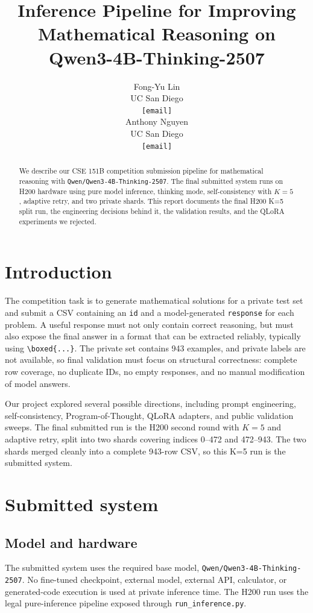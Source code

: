 \documentclass{article}
\title{Inference Pipeline for Improving Mathematical Reasoning on Qwen3-4B-Thinking-2507}
\author{%
  Fong-Yu Lin \\
  UC San Diego \\
  \texttt{[email]} \\
  \And
  Anthony Nguyen \\
  UC San Diego \\
  \texttt{[email]} \\
}
\begin{document}
\maketitle

\begin{abstract}
We describe our CSE 151B competition submission pipeline for mathematical reasoning with \texttt{Qwen/Qwen3-4B-Thinking-2507}. The final submitted system runs on H200 hardware using pure model inference, thinking mode, self-consistency with $K=5$, adaptive retry, and two private shards. This report documents the final H200 K=5 split run, the engineering decisions behind it, the validation results, and the QLoRA experiments we rejected.
\end{abstract}

\section{Introduction}

The competition task is to generate mathematical solutions for a private test set and submit a CSV containing an \texttt{id} and a model-generated \texttt{response} for each problem. A useful response must not only contain correct reasoning, but must also expose the final answer in a format that can be extracted reliably, typically using \verb|\boxed{...}|. The private set contains 943 examples, and private labels are not available, so final validation must focus on structural correctness: complete row coverage, no duplicate IDs, no empty responses, and no manual modification of model answers.

Our project explored several possible directions, including prompt engineering, self-consistency, Program-of-Thought, QLoRA adapters, and public validation sweeps. The final submitted run is the H200 second round with $K=5$ and adaptive retry, split into two shards covering indices 0--472 and 472--943. The two shards merged cleanly into a complete 943-row CSV, so this K=5 run is the submitted system.

\section{Submitted system}

\subsection{Model and hardware}

The submitted system uses the required base model, \texttt{Qwen/Qwen3-4B-Thinking-2507}. No fine-tuned checkpoint, external model, external API, calculator, or generated-code execution is used at private inference time. The H200 run uses the legal pure-inference pipeline exposed through \texttt{run\_inference.py}.
\end{document}
